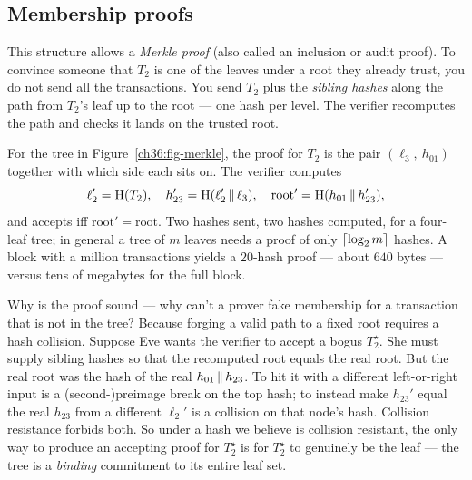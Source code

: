\subsection{Membership proofs}
\label{ch36:merkle-proof}

This structure allows a \emph{Merkle proof} (also called an inclusion or audit proof). To convince someone that $T_2$ is one of the leaves under a root they already trust, you do not send all the transactions. You send $T_2$ plus the \emph{sibling hashes} along the path from $T_2$'s leaf up to the root --- one hash per level. The verifier recomputes the path and checks it lands on the trusted root.

For the tree in Figure~\ref{ch36:fig-merkle}, the proof for $T_2$ is the pair $(\ell_3,\ h_{01})$ together with which side each sits on. The verifier computes
\[
  \ell_2' = \operatorname{H}(T_2),\quad
  h_{23}' = \operatorname{H}(\ell_2' \,\|\, \ell_3),\quad
  \text{root}' = \operatorname{H}(h_{01} \,\|\, h_{23}'),
\]
and accepts iff $\text{root}' = \text{root}$. Two hashes sent, two hashes computed, for a four-leaf tree; in general a tree of $m$ leaves needs a proof of only $\lceil\log_2 m\rceil$ hashes. A block with a million transactions yields a $20$-hash proof --- about $640$ bytes --- versus tens of megabytes for the full block.

\begin{whybox}
Why is the proof sound --- why can't a prover fake membership for a transaction that is not in the tree? Because forging a valid path to a fixed root requires a hash collision. Suppose Eve wants the verifier to accept a bogus $T_2^\star$. She must supply sibling hashes so that the recomputed root equals the real root. But the real root was the hash of the real $h_{01}\,\|\, h_{23}$. To hit it with a different left-or-right input is a (second-)preimage break on the top hash; to instead make $h_{23}'$ equal the real $h_{23}$ from a different $\ell_2'$ is a collision on that node's hash. Collision resistance forbids both. So under a hash we believe is collision resistant, the only way to produce an accepting proof for $T_2^\star$ is for $T_2^\star$ to genuinely be the leaf --- the tree is a \emph{binding} commitment to its entire leaf set.
\end{whybox}

